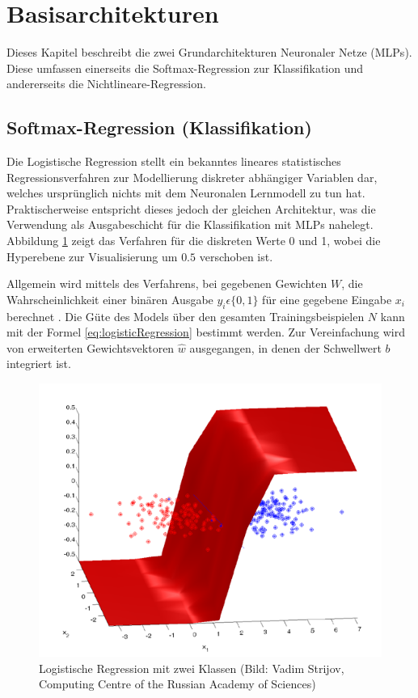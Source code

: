 %



\section{Basisarchitekturen}
Dieses Kapitel beschreibt die zwei Grundarchitekturen Neuronaler Netze (MLPs). Diese umfassen einerseits die  Softmax-Regression zur Klassifikation und andererseits die Nicht\-lineare-Regression.
		
\subsection{Softmax-Regression (Klassifikation)}
\label{ch:softmax}
Die Logistische Regression stellt ein bekanntes lineares statistisches Regressi\-onsverfahren zur Modellierung diskreter abhängiger Variablen dar, welches ursprünglich nichts mit dem Neuronalen Lernmodell zu tun hat. Praktischerweise entspricht dieses jedoch der gleichen Architektur, was die Verwendung als Ausgabeschicht für die Klassifikation mit MLPs nahelegt. Abbildung \ref{fig:2_logistic_regression} zeigt das Verfahren für die diskreten Werte 0 und 1, wobei die Hyperebene zur Visualisierung um $0.5$ verschoben ist.

Allgemein wird mittels des Verfahrens, bei gegebenen Gewichten $W$, die Wahrscheinlichkeit einer binären Ausgabe $y_i \epsilon \{0 ,1\}$ für eine gegebene Eingabe $x_i$ berechnet \cite[vgl. z. B.][S. 119 ff.]{Hastie2009}. 
Die Güte des Models über den gesamten Trainingsbeispielen $N$ kann mit der Formel \ref{eq:logisticRegression} bestimmt werden. Zur Vereinfachung wird von erweiterten Gewichtsvektoren $\hat{w}$ ausgegangen, in denen der Schwellwert $b$ integriert ist.

\begin{figure}
\centering
\includegraphics[width=0.5\linewidth]{images/2_logistic_regression}
\caption[Logistische Regression mit zwei Klassen]{Logistische Regression mit zwei Klassen (Bild: Vadim Strijov, Computing Centre of the Russian Academy of Sciences)}
\label{fig:2_logistic_regression}
\end{figure}


